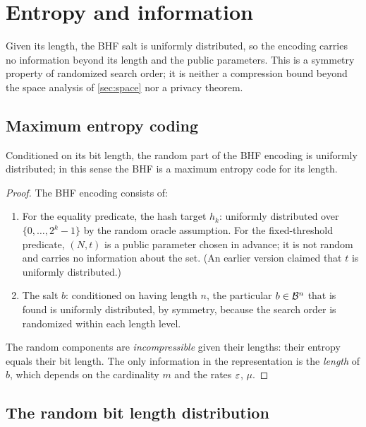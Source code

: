 \section{Entropy and information}
\label{sec:entropy}

Given its length, the BHF salt is uniformly distributed, so the encoding
carries no information beyond its length and the public parameters.
This is a symmetry property of randomized search order; it is neither a
compression bound beyond the space analysis of \cref{sec:space} nor a
privacy theorem.

\subsection{Maximum entropy coding}

\begin{theorem}
\label{thm:max_entropy}
Conditioned on its bit length, the random part of the BHF encoding is
uniformly distributed; in this sense the BHF is a maximum entropy code for
its length.
\end{theorem}
\begin{proof}
The BHF encoding consists of:
\begin{enumerate}
    \item For the equality predicate, the hash target $h_k$: uniformly
    distributed over $\{0,\ldots,2^k-1\}$ by the random oracle assumption.
    For the fixed-threshold predicate, $(N, t)$ is a public parameter chosen
    in advance; it is not random and carries no information about the set.
    (An earlier version claimed that $t$ is uniformly distributed.)
    \item The salt $b$: conditioned on having length $n$, the particular
    $b \in \mathcal{B}^{n}$ that is found is uniformly distributed, by symmetry,
    because the search order is randomized within each length level.
\end{enumerate}
The random components are \emph{incompressible} given their lengths: their
entropy equals their bit length.
The only information in the representation is the \emph{length} of $b$,
which depends on the cardinality $m$ and the rates $\varepsilon$, $\mu$.
\end{proof}

\subsection{The random bit length distribution}

